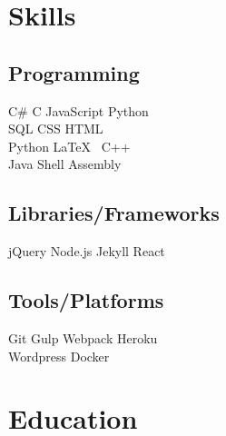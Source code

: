 \documentclass[]{plushcv}
\begin{document}
\hfill
\begin{minipage}[t]{0.25\textwidth} 


\section{Skills}
\subsection{Programming}
\sectionsep
{}
C\# \textbullet{} C \textbullet{} JavaScript \textbullet{} Python    \\ SQL \textbullet{} CSS \textbullet{} HTML \textbullet{} \\
\sectionsep
{}
Python \textbullet{} \LaTeX\ \textbullet{}  C++  \\
\sectionsep
{}
Java \textbullet{}  Shell \textbullet{} Assembly \\
\sectionsep
\sectionsep
\subsection{Libraries/Frameworks}
\sectionsep
jQuery \textbullet{} Node.js \textbullet{} Jekyll \textbullet{} React \\
\sectionsep
\sectionsep
\subsection{Tools/Platforms}
\sectionsep
Git \textbullet{} Gulp \textbullet{} Webpack \textbullet{} Heroku    \\ Wordpress \textbullet{} Docker \\

\sectionsep


\section{Education} 

\sectionsep
{}
\sectionsep



\end{minipage}
\end{document}
